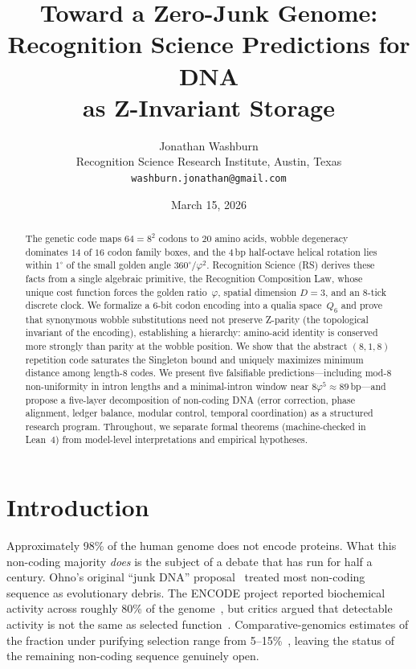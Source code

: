 \documentclass[11pt,a4paper]{article}
\title{\textbf{Toward a Zero-Junk Genome:\\[4pt]
Recognition Science Predictions for DNA\\[4pt]
as Z-Invariant Storage}}
\author{Jonathan Washburn\\
\small Recognition Science Research Institute, Austin, Texas\\
\small \texttt{washburn.jonathan@gmail.com}}
\date{March 15, 2026}
\newcommand{\ph}{\varphi}
\newcommand{\Qsix}{\ensuremath{Q_6}}
\begin{document}
\maketitle

\begin{abstract}
The genetic code maps $64 = 8^2$ codons to $20$ amino acids, wobble degeneracy dominates $14$ of $16$ codon family boxes, and the $4$\,bp half-octave helical rotation lies within $1^\circ$ of the small golden angle $360^\circ/\ph^2$.
Recognition Science (RS) derives these facts from a single algebraic primitive, the Recognition Composition Law, whose unique cost function forces the golden ratio~$\ph$, spatial dimension $D{=}3$, and an 8-tick discrete clock.
We formalize a $6$-bit codon encoding into a qualia space~\Qsix{} and prove that synonymous wobble substitutions need not preserve Z-parity (the topological invariant of the encoding), establishing a hierarchy: amino-acid identity is conserved more strongly than parity at the wobble position.
We show that the abstract $(8,1,8)$ repetition code saturates the Singleton bound and uniquely maximizes minimum distance among length-$8$ codes.
We present five falsifiable predictions---including mod-$8$ non-uniformity in intron lengths and a minimal-intron window near $8\ph^5 \approx 89$\,bp---and propose a five-layer decomposition of non-coding DNA (error correction, phase alignment, ledger balance, modular control, temporal coordination) as a structured research program.
Throughout, we separate formal theorems (machine-checked in Lean~4) from model-level interpretations and empirical hypotheses.
\end{abstract}

\tableofcontents

\section{Introduction}
\label{sec:intro}

Approximately 98\% of the human genome does not encode proteins. What this non-coding majority \emph{does} is the subject of a debate that has run for half a century. Ohno's original ``junk DNA'' proposal~\cite{Ohno1972} treated most non-coding sequence as evolutionary debris. The ENCODE project reported biochemical activity across roughly 80\% of the genome~\cite{ENCODE2012}, but critics argued that detectable activity is not the same as selected function~\cite{Graur2013, Doolittle2013}. Comparative-genomics estimates of the fraction under purifying selection range from 5--15\%~\cite{Ponting2011, Rands2014, Kellis2014}, leaving the status of the remaining non-coding sequence genuinely open.
\end{document}
